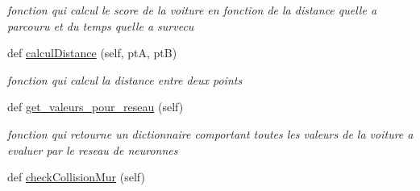 \begin{DoxyCompactItemize}
\begin{DoxyCompactList}\small\item\em fonction qui calcul le score de la voiture en fonction de la distance qu\textquotesingle{}elle a parcouru et du temps qu\textquotesingle{}elle a survecu \end{DoxyCompactList}\item 
def \hyperlink{classsrc_1_1_voiture_1_1voiture_1_1_voiture_a4dad4941537e1670a824a91e7bcde38d}{calcul\+Distance} (self, ptA, ptB)
\begin{DoxyCompactList}\small\item\em fonction qui calcul la distance entre deux points \end{DoxyCompactList}\item 
def \hyperlink{classsrc_1_1_voiture_1_1voiture_1_1_voiture_a1393a9fafd59f721506f550061de7a69}{get\+\_\+valeurs\+\_\+pour\+\_\+reseau} (self)
\begin{DoxyCompactList}\small\item\em fonction qui retourne un dictionnaire comportant toutes les valeurs de la voiture a evaluer par le reseau de neuronnes \end{DoxyCompactList}\item 
def \hyperlink{classsrc_1_1_voiture_1_1voiture_1_1_voiture_aedd6fbfe283ac4e8dbc80ae1ff5aeeb9}{check\+Collision\+Mur} (self)
\end{DoxyCompactItemize}
